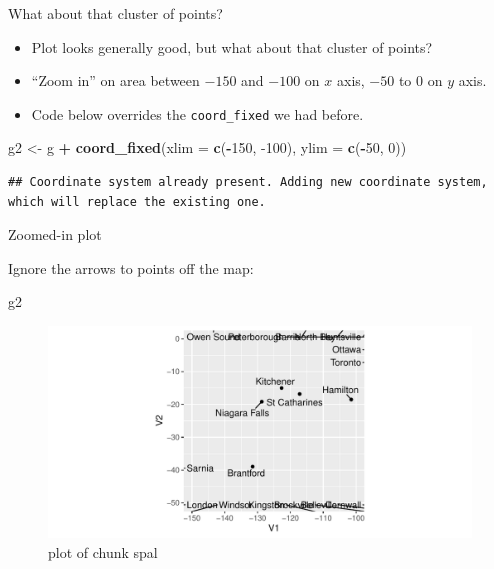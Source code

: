 \documentclass[ignorenonframetext,]{beamer}
\newenvironment{Shaded}{\begin{snugshade}}{\end{snugshade}}
\newcommand{\DataTypeTok}[1]{\textcolor[rgb]{0.13,0.29,0.53}{#1}}
\newcommand{\DecValTok}[1]{\textcolor[rgb]{0.00,0.00,0.81}{#1}}
\newcommand{\KeywordTok}[1]{\textcolor[rgb]{0.13,0.29,0.53}{\textbf{#1}}}
\newcommand{\NormalTok}[1]{#1}
\newcommand{\OperatorTok}[1]{\textcolor[rgb]{0.81,0.36,0.00}{\textbf{#1}}}
\newcommand{\StringTok}[1]{\textcolor[rgb]{0.31,0.60,0.02}{#1}}
\begin{document}
\begin{frame}[fragile]{What about that cluster of points?}
\protect\hypertarget{what-about-that-cluster-of-points}{}

\begin{itemize}
\item
  Plot looks generally good, but what about that cluster of points?
\item
  ``Zoom in'' on area between \(-150\) and \(-100\) on \(x\) axis,
  \(-50\) to 0 on \(y\) axis.
\item
  Code below overrides the \texttt{coord\_fixed} we had before.
\end{itemize}

\small

\begin{Shaded}
\begin{Highlighting}[]
\NormalTok{g2 <-}\StringTok{ }\NormalTok{g }\OperatorTok{+}\StringTok{ }\KeywordTok{coord_fixed}\NormalTok{(}\DataTypeTok{xlim =} \KeywordTok{c}\NormalTok{(}\OperatorTok{-}\DecValTok{150}\NormalTok{, }\DecValTok{-100}\NormalTok{), }\DataTypeTok{ylim =} \KeywordTok{c}\NormalTok{(}\OperatorTok{-}\DecValTok{50}\NormalTok{, }\DecValTok{0}\NormalTok{))}
\end{Highlighting}
\end{Shaded}

\begin{verbatim}
## Coordinate system already present. Adding new coordinate system, which will replace the existing one.
\end{verbatim}

\normalsize

\end{frame}

\begin{frame}[fragile]{Zoomed-in plot}
\protect\hypertarget{zoomed-in-plot}{}

Ignore the arrows to points off the map:

\begin{Shaded}
\begin{Highlighting}[]
\NormalTok{g2}
\end{Highlighting}
\end{Shaded}

\begin{figure}
\centering
\includegraphics{figure/spal-1.pdf}
\caption{plot of chunk spal}
\end{figure}

\end{frame}
\end{document}
